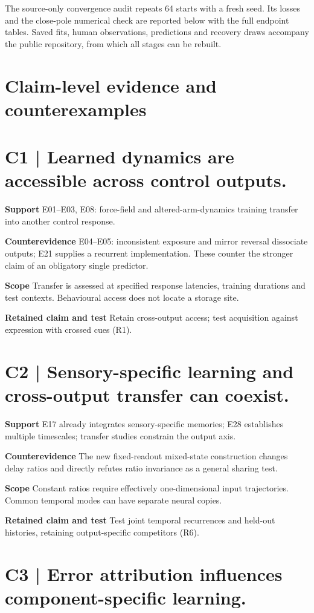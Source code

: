 \documentclass[11pt,a4paper]{article}
\begin{document}
The source-only convergence audit repeats 64 starts with a fresh seed. Its losses and the close-pole numerical check are reported below with the full endpoint tables. Saved fits, human observations, predictions and recovery draws accompany the public repository, from which all stages can be rebuilt.
\clearpage\section{Claim-level evidence and counterexamples}
\medskip\section{C1 | Learned dynamics are accessible across control outputs.}
\textbf{Support} E01--E03, E08: force-field and altered-arm-dynamics training transfer into another control response.\par
\textbf{Counterevidence} E04--E05: inconsistent exposure and mirror reversal dissociate outputs; E21 supplies a recurrent implementation. These counter the stronger claim of an obligatory single predictor.\par
\textbf{Scope} Transfer is assessed at specified response latencies, training durations and test contexts. Behavioural access does not locate a storage site.\par
\textbf{Retained claim and test} Retain cross-output access; test acquisition against expression with crossed cues (R1).\par
\medskip\section{C2 | Sensory-specific learning and cross-output transfer can coexist.}
\textbf{Support} E17 already integrates sensory-specific memories; E28 establishes multiple timescales; transfer studies constrain the output axis.\par
\textbf{Counterevidence} The new fixed-readout mixed-state construction changes delay ratios and directly refutes ratio invariance as a general sharing test.\par
\textbf{Scope} Constant ratios require effectively one-dimensional input trajectories. Common temporal modes can have separate neural copies.\par
\textbf{Retained claim and test} Test joint temporal recurrences and held-out histories, retaining output-specific competitors (R6).\par
\clearpage\section{C3 | Error attribution influences component-specific learning.}
\end{document}
